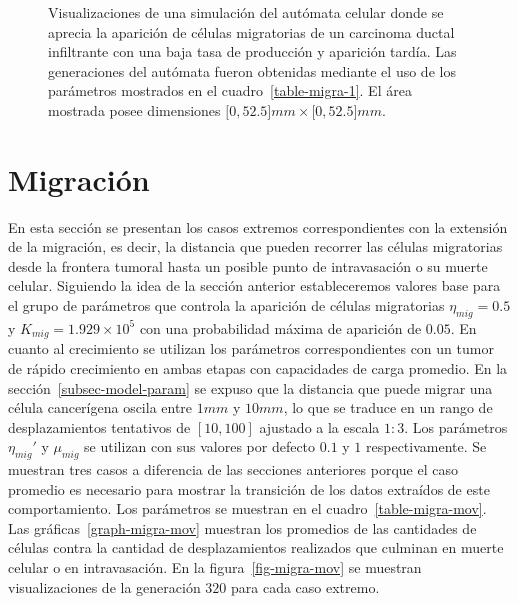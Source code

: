 \begin{figure}[p]
\begin{center}
\end{center}\vspace*{-0.6cm}
\caption[Visualizaciones de una simulaci\'on del aut\'omata celular donde se aprecia la aparici\'on de c\'elulas migratorias de un carcinoma ductal infiltrante con una baja tasa de producci\'on y aparici\'on tard\'ia]{Visualizaciones de una simulaci\'on del aut\'omata celular donde se aprecia la aparici\'on de c\'elulas migratorias de un carcinoma ductal infiltrante con una baja tasa de producci\'on y aparici\'on tard\'ia. Las generaciones del aut\'omata fueron obtenidas mediante el uso de los par\'ametros mostrados en el cuadro~\ref{table-migra-1}. El \'area mostrada posee dimensiones $[0,52$.$5]mm \times [0,52$.$5]mm$.}
\label{fig-migra-automata-1}
\end{figure}

\section{Migraci\'on}
\label{sec-migra-mov-results}
En esta secci\'on se presentan los casos extremos correspondientes con la extensi\'on de la migraci\'on, es decir, la distancia que pueden recorrer las c\'elulas migratorias desde la frontera tumoral hasta un posible punto de intravasaci\'on o su muerte celular. Siguiendo la idea de la secci\'on anterior estableceremos valores base para el grupo de par\'ametros que controla la aparici\'on de c\'elulas migratorias $\eta_{mig}=0$.$5$ y $K_{mig}=1$.$929 \times 10^5$ con una probabilidad m\'axima de aparici\'on de $0$.$05$. En cuanto al crecimiento se utilizan los par\'ametros correspondientes con un tumor de r\'apido crecimiento en ambas etapas con capacidades de carga promedio. En la secci\'on~\ref{subsec-model-param} se expuso que la distancia que puede migrar una c\'elula cancer\'igena oscila entre $1mm$ y $10mm$, lo que se traduce en un rango de desplazamientos tentativos de $[10,100]$ ajustado a la escala $1:3$. Los par\'ametros $\eta_{mig}'$ y $\mu_{mig}$ se utilizan con sus valores por defecto $0$.$1$ y $1$ respectivamente. Se muestran tres casos a diferencia de las secciones anteriores porque el caso promedio es necesario para mostrar la transici\'on de los datos extra\'idos de este comportamiento. Los par\'ametros se muestran en el cuadro~\ref{table-migra-mov}. Las gr\'aficas~\ref{graph-migra-mov} muestran los promedios de las cantidades de c\'elulas contra la cantidad de desplazamientos realizados que culminan en muerte celular o en intravasaci\'on. En la figura~\ref{fig-migra-mov} se muestran visualizaciones de la generaci\'on $320$ para cada caso extremo.

